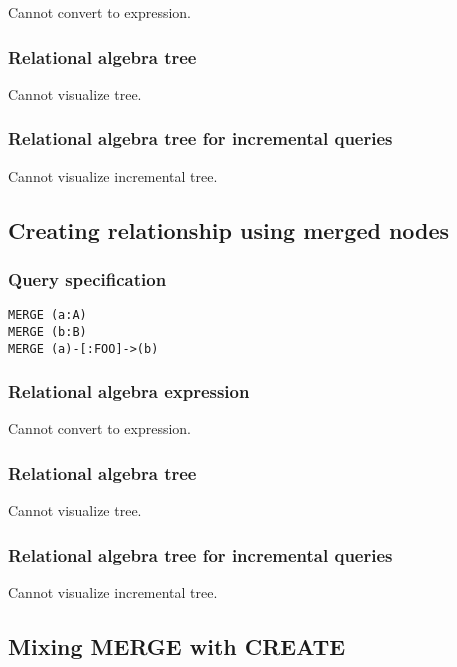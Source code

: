 Cannot convert to expression.

\subsubsection*{Relational algebra tree}

Cannot visualize tree.

\subsubsection*{Relational algebra tree for incremental queries}

Cannot visualize incremental tree.

\subsection{Creating relationship using merged nodes}

\subsubsection*{Query specification}

\begin{lstlisting}
MERGE (a:A)
MERGE (b:B)
MERGE (a)-[:FOO]->(b)
\end{lstlisting}

\subsubsection*{Relational algebra expression}

Cannot convert to expression.

\subsubsection*{Relational algebra tree}

Cannot visualize tree.

\subsubsection*{Relational algebra tree for incremental queries}

Cannot visualize incremental tree.

\subsection{Mixing MERGE with CREATE}

